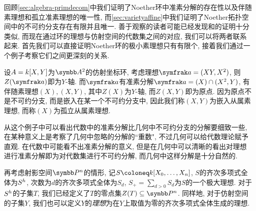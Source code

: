 回顾\ref{sec:algebra-primdecom}中我们证明了Noether环中准素分解的存在性以及伴随素理想和孤立准素理想的唯一性, 而\ref{sec:varietyaffine}中我们证明了Noether拓扑空间中的不可约分支存在有限并且唯一. 善于观察的读者可能已经发现和的证明十分类似, 而现在通过环的理想与仿射空间的代数集之间的对应, 我们可以将两者联系起来. 首先我们可以直接证明Noether环的极小素理想只有有限个, 接着我们通过一个例子考察它们之间更深刻的关系.

\begin{example}\label{exm:primarydecom}
  设$A=k [X, Y]$为$\AF^2$的仿射坐标环, 考虑理想$\ideal{a}=(XY, X^2)$, 则$Z(\ideal{a})$即为$Y$-轴. 而$\ideal{a}$有准素分解$\ideal{a}=(X)\cap (X^2, Y)$, 有伴随素理想$(X), (X, Y)$, 其中$Z(X)$为$Y$-轴, 而$Z(X, Y)$即为原点. 因为原点不是不可约分支, 而是嵌入在某一个不可约分支中, 因此我们称$(X, Y)$为嵌入从属素理想, 而称$(X)$为孤立从属素理想.
\end{example}

从这个例子中可以看出代数中的准素分解比几何中不可约分支的分解要细致一些, 在某种意义上是考察了几何中忽略的分解的``重数", 不过几何可以给代数理论赋予直观. 在代数中可能看不出准素分解的意义, 但是在几何中可以清晰的看出对理想进行准素分解即为对代数集进行不可约分解, 而几何中这样分解是十分自然的.

\bigskip

再考虑射影空间$\PP^n$的情形, 记$S\coloneq \kk [X_0, \dotsc, X_n]$, $S$的齐次多项式全体为$S^h$, 次数为$d$的齐次多项式全体为$S_d$, $S_+=\sum_{d>0}S_d$为$S$的一个极大理想. 对于$S^h$的子集$T$, 我们已经定义了$T$的零点集$Z(T)\subseteq\PP^n$. 同样地, 对于仿射空间的子集$Y$, 我们也可以定义$Y$的\emph{理想}为在$Y$上取值为零的齐次多项式全体生成的理想.


